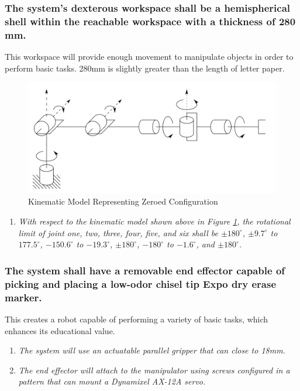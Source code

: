 \documentclass[12pt]{report}
\begin{document}
\subsubsection{The system’s dexterous workspace shall be a hemispherical shell within the reachable workspace with a thickness of 280 mm.}
This workspace will provide enough movement to manipulate objects in order to perform basic tasks. 280mm is slightly greater than the length of letter paper.
\begin{figure}[htp]
  \centering
  \includegraphics[width=.75\textwidth]{zero}
  \caption{Kinematic Model Representing Zeroed Configuration}
  \label{fig:zero}
\end{figure}
\begin{enumerate}[label=\thesubsubsection.\alph*,leftmargin=3cm,font=\itshape]
  \item \textit{With respect to the kinematic model shown above in Figure \ref{fig:zero}, the rotational limit of joint one, two, three, four, five, and six shall be \(\pm180^{\circ}\), \(\pm9.7^{\circ}\) to \(177.5^{\circ}\), \(-150.6^{\circ}\) to \(-19.3^{\circ}\), \(\pm180^{\circ}\), \(-180^{\circ}\) to \(-1.6^{\circ}\), and \(\pm180^{\circ}\).}
\end{enumerate}
\subsubsection{The system shall have a removable end effector capable of picking and placing a low-odor chisel tip Expo dry erase marker.}
This creates a robot capable of performing a variety of basic tasks, which enhances its educational value.
\begin{enumerate}[label=\thesubsubsection.\alph*,leftmargin=3cm,font=\itshape]
  \item \textit{The system will use an actuatable parallel gripper that can close to 18mm.}
  \item \textit{The end effector will attach to the manipulator using screws configured in a pattern that can mount a Dynamixel AX-12A servo.}
\end{enumerate}
\end{document}
